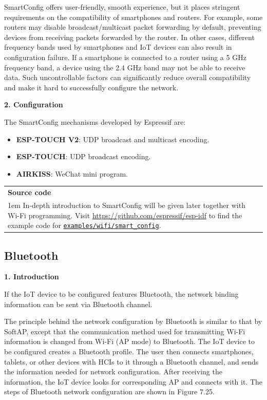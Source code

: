 \documentclass[a4paper,12pt,openany]{book}
\newcommand{\note}[2][NOTE]{ %
\vspace{6pt}
\begin{tabular}{b{\textwidth}}
\hline
\fontfamily{phv}\selectfont \textbf{#1}\\
\leftskip 1em #2\\
\hline
\end{tabular}
}
\begin{document}
SmartConfig offers user-friendly, smooth experience, but it places stringent requirements on the compatibility of smartphones and routers. For example, some routers may disable broadcast/multicast packet forwarding by default, preventing devices from receiving packets forwarded by the router. In other cases, different frequency bands used by smartphones and IoT devices can also result in configuration failure. If a smartphone is connected to a router using a 5 GHz frequency band, a device using the 2.4 GHz band may not be able to receive data. Such uncontrollable factors can significantly reduce overall compatibility and make it hard to successfully configure the network.

\textbf{2. Configuration}

The SmartConfig mechanisms developed by Espressif are:

\begin{itemize}
    \item \textbf{ESP-TOUCH V2}: UDP broadcast and multicast encoding.
    \parskip 0pt
    \item \textbf{ESP-TOUCH}: UDP broadcast encoding.
    \item \textbf{AIRKISS}: WeChat mini program.
\end{itemize}

\note[Source code]{In-depth introduction to SmartConfig will be given later together with Wi-Fi programming. Visit \url{https://github.com/espressif/esp-idf} to find the example code for \href{https://github.com/espressif/esp-idf/tree/master/examples/wifi/smart_config}{\texttt{examples/wifi/smart\_config}}.}

\subsection{Bluetooth}
\textbf{1. Introduction}

If the IoT device to be configured features Bluetooth, the network binding information can be sent via Bluetooth channel.

The principle behind the network configuration by Bluetooth is similar to that by SoftAP, except that the communication method used for transmitting Wi-Fi information is changed from Wi-Fi (AP mode) to Bluetooth. The IoT device to be configured creates a Bluetooth profile. The user then connects smartphones, tablets, or other devices with HCIs to it through a Bluetooth channel, and sends the information needed for network configuration. After receiving the information, the IoT device looks for corresponding AP and connects with it. The steps of Bluetooth network configuration are shown in Figure 7.25.
\end{document}

